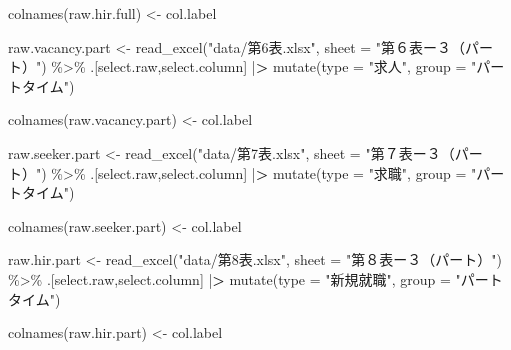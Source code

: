 \documentclass[
]{book}
\newenvironment{Shaded}{\begin{snugshade}}{\end{snugshade}}
\newcommand{\AttributeTok}[1]{\textcolor[rgb]{0.77,0.63,0.00}{#1}}
\newcommand{\ErrorTok}[1]{\textcolor[rgb]{0.64,0.00,0.00}{\textbf{#1}}}
\newcommand{\FunctionTok}[1]{\textcolor[rgb]{0.00,0.00,0.00}{#1}}
\newcommand{\NormalTok}[1]{#1}
\newcommand{\OtherTok}[1]{\textcolor[rgb]{0.56,0.35,0.01}{#1}}
\newcommand{\SpecialCharTok}[1]{\textcolor[rgb]{0.00,0.00,0.00}{#1}}
\newcommand{\StringTok}[1]{\textcolor[rgb]{0.31,0.60,0.02}{#1}}
\begin{document}
\begin{Shaded}
\begin{Highlighting}[]
\FunctionTok{colnames}\NormalTok{(raw.hir.full) }\OtherTok{\textless{}{-}}\NormalTok{ col.label}


\NormalTok{raw.vacancy.part }\OtherTok{\textless{}{-}}
  \FunctionTok{read\_excel}\NormalTok{(}\StringTok{"data/第6表.xlsx"}\NormalTok{,}
             \AttributeTok{sheet =} \StringTok{"第６表ー３（パート）"}\NormalTok{) }\SpecialCharTok{\%\textgreater{}\%}
\NormalTok{  .[select.raw,select.column] }\SpecialCharTok{|}\ErrorTok{\textgreater{}} 
  \FunctionTok{mutate}\NormalTok{(}\AttributeTok{type =} \StringTok{"求人"}\NormalTok{,}
         \AttributeTok{group =} \StringTok{"パートタイム"}\NormalTok{)}

\FunctionTok{colnames}\NormalTok{(raw.vacancy.part) }\OtherTok{\textless{}{-}}\NormalTok{ col.label}

\NormalTok{raw.seeker.part }\OtherTok{\textless{}{-}}
  \FunctionTok{read\_excel}\NormalTok{(}\StringTok{"data/第7表.xlsx"}\NormalTok{,}
             \AttributeTok{sheet =} \StringTok{"第７表ー３（パート）"}\NormalTok{) }\SpecialCharTok{\%\textgreater{}\%}
\NormalTok{  .[select.raw,select.column] }\SpecialCharTok{|}\ErrorTok{\textgreater{}} 
  \FunctionTok{mutate}\NormalTok{(}\AttributeTok{type =} \StringTok{"求職"}\NormalTok{,}
         \AttributeTok{group =} \StringTok{"パートタイム"}\NormalTok{)}

\FunctionTok{colnames}\NormalTok{(raw.seeker.part) }\OtherTok{\textless{}{-}}\NormalTok{ col.label}

\NormalTok{raw.hir.part }\OtherTok{\textless{}{-}}
  \FunctionTok{read\_excel}\NormalTok{(}\StringTok{"data/第8表.xlsx"}\NormalTok{,}
             \AttributeTok{sheet =} \StringTok{"第８表ー３（パート）"}\NormalTok{) }\SpecialCharTok{\%\textgreater{}\%}
\NormalTok{  .[select.raw,select.column] }\SpecialCharTok{|}\ErrorTok{\textgreater{}} 
  \FunctionTok{mutate}\NormalTok{(}\AttributeTok{type =} \StringTok{"新規就職"}\NormalTok{,}
         \AttributeTok{group =} \StringTok{"パートタイム"}\NormalTok{)}

\FunctionTok{colnames}\NormalTok{(raw.hir.part) }\OtherTok{\textless{}{-}}\NormalTok{ col.label}


\end{Highlighting}
\end{Shaded}
\end{document}
